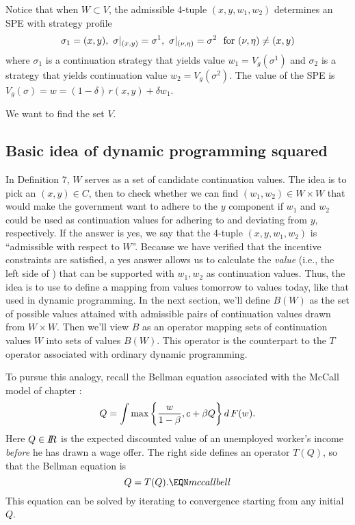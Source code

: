 \medskip %
Notice that when $W\subset V$,
 the admissible 4-tuple $(x,y,w_1,w_2)$
determines an SPE with strategy profile
$$\sigma_1 = (x,y),\ \sigma\vert_{(x,y)} = \sigma^1,\ \sigma\vert_{(\nu,\eta)}
= \sigma^2\ \hbox{ for } (\nu,\eta)\not= (x,y)$$ where $\sigma_1$
is a continuation strategy that yields  value $w_1 = V_g
(\sigma^1)$ and $\sigma_2$ is a strategy that yields
continuation value $w_2 = V_g(\sigma^2)$.   The value of the
SPE is $V_g(\sigma) = w = (1-\delta)\, r(x,y)
 + \delta w_1$.

We want to find the set $V$.

\medskip
\subsection{Basic idea of dynamic programming squared}
 In Definition 7, $W$ serves as a set of candidate
continuation values. The idea is to pick an $(x,y)\in C$,  then to
check whether we can find  $(w_1, w_2)  \in W \times W $
that would make the government want to
adhere to the $y$ component if $w_1$ and  $w_2$ could be used as
continuation values for adhering to and deviating from $y$, respectively. If
the answer is yes, we say that the 4-tuple $(x,y,w_1,w_2)$ is
``admissible with  respect to $W$''.  Because we have
verified that the  incentive constraints are satisfied, a yes answer allows us
to  calculate the {\it value\/} (i.e., the left side of )
that can be supported with $w_1, w_2$ as continuation values.
Thus, the idea is to use  to define a mapping  from values
tomorrow to values today, like that used in dynamic programming.
In the next section, we'll define $B(W)$ as the set of possible
values attained with admissible pairs of continuation values drawn from
$W \times W$.  Then we'll view  $B$ as an operator mapping sets of continuation values $W$ into sets of values $B(W)$.
This operator is the counterpart to  the
$T$ operator associated with ordinary dynamic
programming.  %

To pursue this analogy, recall the Bellman
equation associated with the  McCall model
of chapter :
$$ Q = \int  \max \left\{ {w \over 1 -\beta} , c + \beta Q \right\}
 d \, F(w). $$
Here $Q \in {\bbR}$  is the expected discounted value of an unemployed  worker's
income {\it before\/} he has drawn a wage offer.
The right side defines an operator $T(Q)$, so
that the Bellman equation is $$Q  = T(Q). \EQN mccallbell $$ This equation
can be
 solved by iterating to convergence starting from any initial $Q$.

